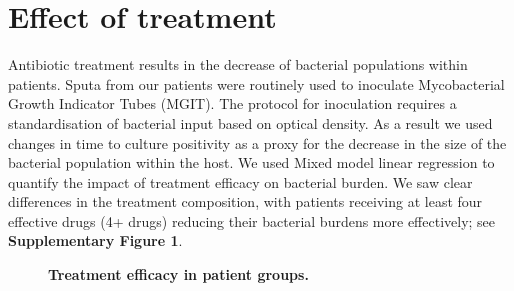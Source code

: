 \documentclass[12pt, oneside]{article}   	%
\begin{document}
\newpage

\section{Effect of treatment}
Antibiotic treatment results in the decrease of bacterial populations within patients. Sputa from our patients were routinely used to inoculate Mycobacterial Growth Indicator Tubes (MGIT). The protocol for inoculation requires a standardisation of bacterial input based on optical density. As a result we used changes in time to culture positivity as a proxy for the decrease in the size of the bacterial population within the host. We used Mixed model linear regression to quantify the impact of treatment efficacy on bacterial burden. We saw clear differences in the treatment composition, with patients receiving at least four effective drugs (4+ drugs) reducing their bacterial burdens more effectively; see \textbf{Supplementary Figure 1}.

\begin{figure}
\label{fig:supfig1}
\centering
{}
\caption{\textbf{Treatment efficacy in patient groups.}}
\end{figure}
\end{document}
